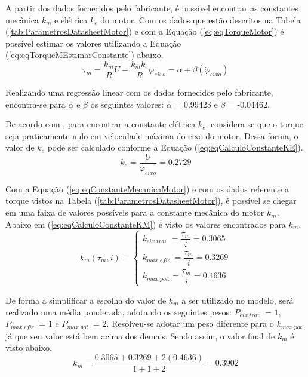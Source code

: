 A partir dos dados fornecidos pelo fabricante, é possível encontrar as constantes mecânica $k_m$ e elétrica $k_e$ do motor. Com os dados que estão descritos na Tabela (\ref{tab:ParametrosDatasheetMotor}) e com a Equação (\ref{eq:eqTorqueMotor}) é possível estimar os valores utilizando a Equação (\ref{eq:eqTorqueMEstimarConstante}) abaixo.
\begin{equation}\label{eq:eqTorqueMEstimarConstante}
    \tau_{m} = \dfrac{k_{m}}{R}U - \dfrac{k_{m}k_{e}}{R}\dot{\varphi}_{eixo} = \alpha + \beta(\dot{\varphi}_{eixo})
\end{equation}

Realizando uma regressão linear com os dados fornecidos pelo fabricante, encontra-se para $\alpha$ e $\beta$ os seguintes valores: $\alpha$ = 0.99423 e $\beta$ = -0.04462.

De acordo com \cite{Silva:17}, para encontrar a constante elétrica $k_e$, considera-se que o torque seja praticamente nulo em velocidade máxima do eixo do motor. Dessa forma, o valor de $k_e$ pode ser calculado conforme a Equação (\ref{eq:eqCalculoConstanteKE}).
\begin{equation}\label{eq:eqCalculoConstanteKE}
    k_{e} = \dfrac{U}{\dot{\varphi}_{eixo}} = 0.2729
\end{equation}

Com a Equação (\ref{eq:eqConstanteMecanicaMotor}) e com os dados referente a torque vistos na Tabela (\ref{tab:ParametrosDatasheetMotor}), é possível se chegar em uma faixa de valores possíveis para a constante mecânica do motor $k_m$. Abaixo em (\ref{eq:eqCalculoConstanteKM}) é visto os valores encontrados para $k_m$.
\begin{equation}\label{eq:eqCalculoConstanteKM}
k_{m}(\tau_{m},i) =
\begin{cases}
    k_{eix.trav.} = \dfrac{\tau_{m}}{i} = 0.3065 \\[6pt]
    k_{max.efic.} = \dfrac{\tau_{m}}{i} = 0.3269 \\[6pt]
    k_{max.pot.}  = \dfrac{\tau_{m}}{i} = 0.4636
\end{cases}
\end{equation}

De forma a simplificar a escolha do valor de $k_m$ a ser utilizado no modelo, será realizado uma média ponderada, adotando os seguintes pesos: $P_{eix.trav.}$ = $1$, $P_{max.efic.}$ = $1$ e $P_{max.pot.}$ = $2$. Resolveu-se adotar um peso diferente para o $k_{max.pot.}$ já que seu valor está bem acima dos demais. Sendo assim, o valor final de $k_m$ é visto abaixo.
\begin{equation}\label{eq:eqCalculoConstanteKMFinal}
    k_{m} = \dfrac{0.3065 + 0.3269 + 2(0.4636)}{1 + 1 + 2} = 0.3902
\end{equation}

